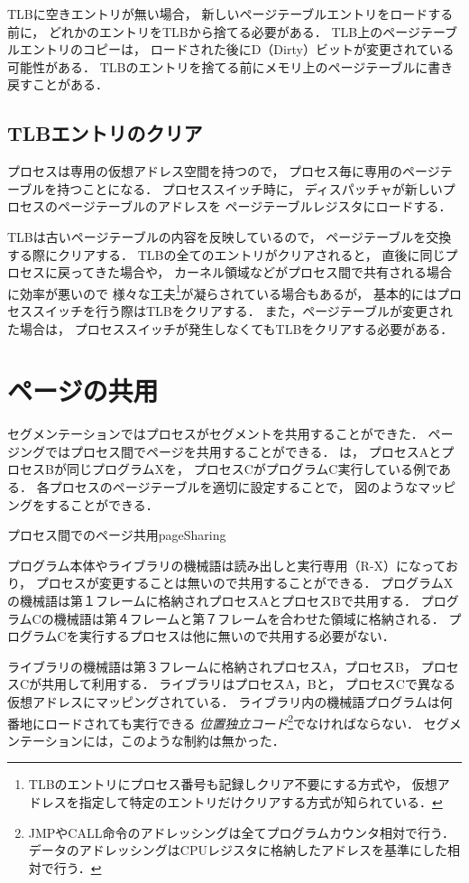TLBに空きエントリが無い場合，
新しいページテーブルエントリをロードする前に，
どれかのエントリをTLBから捨てる必要がある．
TLB上のページテーブルエントリのコピーは，
ロードされた後にD（Dirty）ビットが変更されている可能性がある．
TLBのエントリを捨てる前にメモリ上のページテーブルに書き戻すことがある．

\subsection{TLBエントリのクリア}
プロセスは専用の仮想アドレス空間を持つので，
プロセス毎に専用のページテーブルを持つことになる．
プロセススイッチ時に，
ディスパッチャが新しいプロセスのページテーブルのアドレスを
ページテーブルレジスタにロードする．

TLBは古いページテーブルの内容を反映しているので，
ページテーブルを交換する際にクリアする．
TLBの全てのエントリがクリアされると，
直後に同じプロセスに戻ってきた場合や，
カーネル領域などがプロセス間で共有される場合に効率が悪いので
様々な工夫\footnote{
TLBのエントリにプロセス番号も記録しクリア不要にする方式や，
仮想アドレスを指定して特定のエントリだけクリアする方式が知られている．
}が凝らされている場合もあるが，
基本的にはプロセススイッチを行う際はTLBをクリアする．
また，ページテーブルが変更された場合は，
プロセススイッチが発生しなくてもTLBをクリアする必要がある．

\section{ページの共用}
セグメンテーションではプロセスがセグメントを共用することができた．
ページングではプロセス間でページを共用することができる．
は，
プロセスAとプロセスBが同じプログラムXを，
プロセスCがプログラムC実行している例である．
各プロセスのページテーブルを適切に設定することで，
図のようなマッピングをすることができる．

{プロセス間でのページ共用}{pageSharing}

プログラム本体やライブラリの機械語は読み出しと実行専用（R-X）になっており，
プロセスが変更することは無いので共用することができる．
プログラムXの機械語は第１フレームに格納されプロセスAとプロセスBで共用する．
プログラムCの機械語は第４フレームと第７フレームを合わせた領域に格納される．
プログラムCを実行するプロセスは他に無いので共用する必要がない．

ライブラリの機械語は第３フレームに格納されプロセスA，プロセスB，
プロセスCが共用して利用する．
ライブラリはプロセスA，Bと，
プロセスCで異なる仮想アドレスにマッピングされている．
ライブラリ内の機械語プログラムは何番地にロードされても実行できる
\emph{位置独立コード}\footnote{
JMPやCALL命令のアドレッシングは全てプログラムカウンタ相対で行う．
データのアドレッシングはCPUレジスタに格納したアドレスを基準にした相対で行う．
}でなければならない．
セグメンテーションには，このような制約は無かった．

